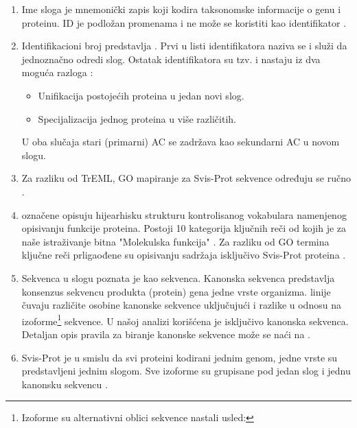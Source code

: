 \begin{enumerate}
  \item Ime sloga   je mnemonički zapis koji kodira
    taksonomske informacije o genu i proteinu. ID je podložan promenama 
    i ne može se koristiti kao identifikator \parencite{www_svisprot}.
  \item Identifikacioni broj predstavlja  .
    Prvi u listi identifikatora naziva se  i služi da
    jednoznačno odredi slog. Ostatak identifikatora su tzv.  i
    nastaju iz dva moguća razloga \parencite{svisprot2003, www_svisprot}:
    \begin{itemize}
      \item Unifikacija postojećih proteina u jedan novi slog. 
      \item Specijalizacija jednog proteina u više različitih.
    \end{itemize}
    U oba slučaja stari (primarni) AC se zadržava kao sekundarni AC u novom slogu.

  \item Za razliku od TrEML, GO mapiranje za Svis-Prot sekvence određuju se ručno \parencite{www_svisprot}.

  \item {}  označene  opisuju
    hijearhisku strukturu kontrolisanog vokabulara namenjenog opisivanju
    funkcije proteina. Postoji 10 kategorija ključnih reči od kojih je za naše
    istraživanje bitna "Molekulska funkcija" \parencite{svisprot2003}.  Za razliku od GO termina ključne
    reči prligaođene su opisivanju sadržaja isključivo Svis-Prot proteina \parencite{www_svisprot}.

  \item Sekvenca  u slogu poznata je kao 
     sekvenca. Kanonska sekvenca predstavlja konsenzus sekvencu
    produkta (protein) gena jedne vrste organizma.  
    linije čuvaju različite osobine kanonske sekvence uključujući i razlike u
    odnosu na izoforme\footnote{Izoforme su alternativni oblici sekvence
      nastali usled:  } sekvence.  U našoj
    analizi korišćena je isključivo kanonska sekvenca. Detaljan opis pravila za
    biranje kanonske sekvence može se naći na \parencite{www_svisprot}.

  \item
    \label{red}
    Svis-Prot je  u smislu da svi proteini
    kodirani jednim genom, jedne vrste su predstavljeni jednim slogom. Sve
    izoforme su grupisane pod jedan slog i jednu kanonsku sekvencu \parencite{nonRedundant}.


\end{enumerate}
